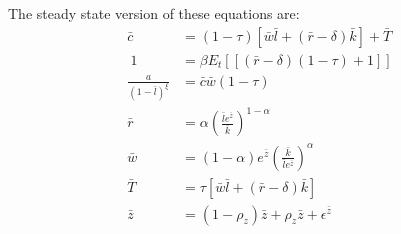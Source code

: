 \documentclass[12pt]{article}
\begin{document}
The steady state version of these equations are:
\begin{align}
\bar{c} &= (1 - \tau)[\bar{w} \bar{l} + (\bar{r} -\delta)\bar{k}] + \bar{T}  \\
\ 1 &= \beta E_t\left[ [(\bar{r} - \delta)(1 - \tau) + 1]\right] \\
\frac{a}{(1-\bar{l})^{\xi}} &= \bar{c} \bar{w} (1-\tau) \\
\bar{r} &= \alpha \left( \frac{\bar{l} e^{\bar{z}}}{\bar{k}} \right)^{1 - \alpha} \\
\bar{w} &= (1 - \alpha) e^{\bar{z}} \left( \frac{\bar{k}}{\bar{l} e^{\bar{z}}} \right)^{\alpha} \\
\bar{T} &= \tau[\bar{w} \bar{l} + (\bar{r} - \delta)\bar{k}] \\
\bar{z} &= (1-\rho_z)\bar{z} + \rho_z \bar{z} + \epsilon^{\bar{z}}
\end{align}
\end{document}
